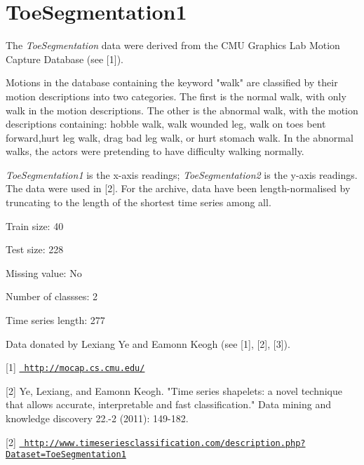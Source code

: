 \chapter{Toe\+Segmentation1}
\hypertarget{md_external_2data_2UCRArchive__2018_2ToeSegmentation1_2README}{}\label{md_external_2data_2UCRArchive__2018_2ToeSegmentation1_2README}
\label{md_external_2data_2UCRArchive__2018_2ToeSegmentation1_2README_autotoc_md219}%
%
 The {\itshape Toe\+Segmentation} data were derived from the CMU Graphics Lab Motion Capture Database (see \mbox{[}1\mbox{]}).

Motions in the database containing the keyword "{}walk"{} are classified by their motion descriptions into two categories. The first is the normal walk, with only walk in the motion descriptions. The other is the abnormal walk, with the motion descriptions containing\+: hobble walk, walk wounded leg, walk on toes bent forward,hurt leg walk, drag bad leg walk, or hurt stomach walk. In the abnormal walks, the actors were pretending to have difficulty walking normally.

{\itshape Toe\+Segmentation1} is the x-\/axis readings; {\itshape Toe\+Segmentation2} is the y-\/axis readings. The data were used in \mbox{[}2\mbox{]}. For the archive, data have been length-\/normalised by truncating to the length of the shortest time series among all.

Train size\+: 40

Test size\+: 228

Missing value\+: No

Number of classses\+: 2

Time series length\+: 277

Data donated by Lexiang Ye and Eamonn Keogh (see \mbox{[}1\mbox{]}, \mbox{[}2\mbox{]}, \mbox{[}3\mbox{]}).

\mbox{[}1\mbox{]} \href{http://mocap.cs.cmu.edu/}{\texttt{ http\+://mocap.\+cs.\+cmu.\+edu/}} ~\newline


\mbox{[}2\mbox{]} Ye, Lexiang, and Eamonn Keogh. "{}\+Time series shapelets\+: a novel technique that allows accurate, interpretable and fast classification."{} Data mining and knowledge discovery 22.-\/2 (2011)\+: 149-\/182.

\mbox{[}2\mbox{]} \href{http://www.timeseriesclassification.com/description.php?Dataset=ToeSegmentation1}{\texttt{ http\+://www.\+timeseriesclassification.\+com/description.\+php?\+Dataset=\+Toe\+Segmentation1}} 